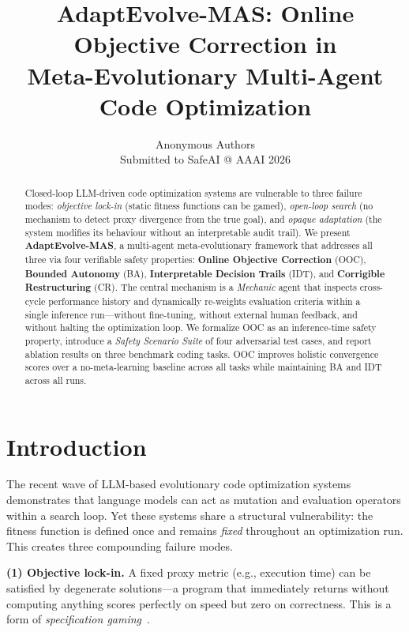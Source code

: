 \documentclass[letterpaper]{article}
\title{AdaptEvolve-MAS: Online Objective Correction in\\
       Meta-Evolutionary Multi-Agent Code Optimization}
\author{
  Anonymous Authors \\
  Submitted to SafeAI @ AAAI 2026
}
\begin{document}
\maketitle

\begin{abstract}
Closed-loop LLM-driven code optimization systems are vulnerable to three
failure modes: \emph{objective lock-in} (static fitness functions can be
gamed), \emph{open-loop search} (no mechanism to detect proxy divergence
from the true goal), and \emph{opaque adaptation} (the system modifies its
behaviour without an interpretable audit trail).
We present \textbf{AdaptEvolve-MAS}, a multi-agent meta-evolutionary framework
that addresses all three via four verifiable safety properties:
\textbf{Online Objective Correction} (OOC),
\textbf{Bounded Autonomy} (BA),
\textbf{Interpretable Decision Trails} (IDT), and
\textbf{Corrigible Restructuring} (CR).
The central mechanism is a \emph{Mechanic} agent that inspects
cross-cycle performance history and dynamically re-weights evaluation
criteria within a single inference run---without fine-tuning, without
external human feedback, and without halting the optimization loop.
We formalize OOC as an inference-time safety property, introduce a
\emph{Safety Scenario Suite} of four adversarial test cases, and report
ablation results on three benchmark coding tasks.
OOC improves holistic convergence scores over a no-meta-learning baseline
across all tasks while maintaining BA and IDT across all runs.
\end{abstract}

\section{Introduction}

The recent wave of LLM-based evolutionary code optimization
systems~\cite{funSearch2023,openEvolve2024} demonstrates that language
models can act as mutation and evaluation operators within a search loop.
Yet these systems share a structural vulnerability: the fitness function
is defined once and remains \emph{fixed} throughout an optimization run.
This creates three compounding failure modes.

\textbf{(1) Objective lock-in.} A fixed proxy metric
(e.g., execution time) can be satisfied by degenerate solutions---a
program that immediately returns without computing anything scores
perfectly on speed but zero on correctness.  This is a form of
\emph{specification gaming}~\cite{krakovna2020}.
\end{document}
